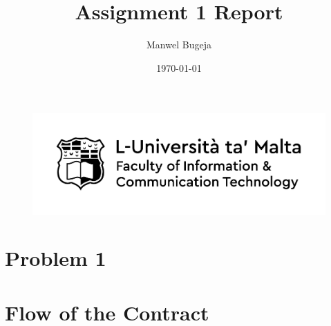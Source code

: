 \documentclass[a4paper, 12pt]{article}
\begin{document}
\begin{figure}
    \centering
    \includegraphics[width=1\textwidth]{Logo}
\end{figure}

\title{Assignment 1 Report}
\author{Manwel Bugeja}
\date{\today}
\maketitle
  
\tableofcontents
\newpage

\section{Problem 1}

\section{Flow of the Contract}
\end{document}
